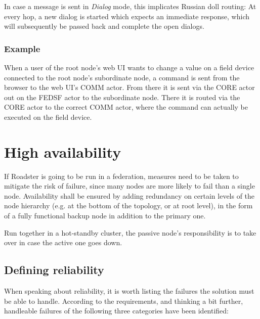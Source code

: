 In case a message is sent in \emph{Dialog} mode, this implicates Russian doll
routing: At every hop, a new dialog is started which expects an immediate
response, which will subsequently be passed back and complete the open dialogs.

\subsubsection{Example}
When a user of the root node's web UI wants to change a value on a field device
connected to the root node's subordinate node, a command is sent from the
browser to the web UI's COMM actor. From there it is sent via the CORE actor out
on the FEDSF actor to the subordinate node. There it is routed
via the CORE actor to the correct COMM actor, where the command can actually be
executed on the field device.

\section{High availability}\label{sec:approach:ha}
If Roadster is going to be run in a federation, measures need to be taken to
mitigate the risk of failure, since many nodes are more likely to fail than a
single node. Availability shall be ensured by
adding redundancy on certain levels of the node hierarchy (e.g. at the bottom
of the topology, or at root level), in the form of a
fully functional backup node in addition to the primary one.

Run together in a hot-standby cluster, the passive node's responsibility is to
take over in case the active one goes down.

\subsection{Defining reliability}
When speaking about reliability, it is worth listing the failures the solution must be
able to handle. According to the requirements, and thinking a bit further,
handleable failures of the following three categories have been identified:

